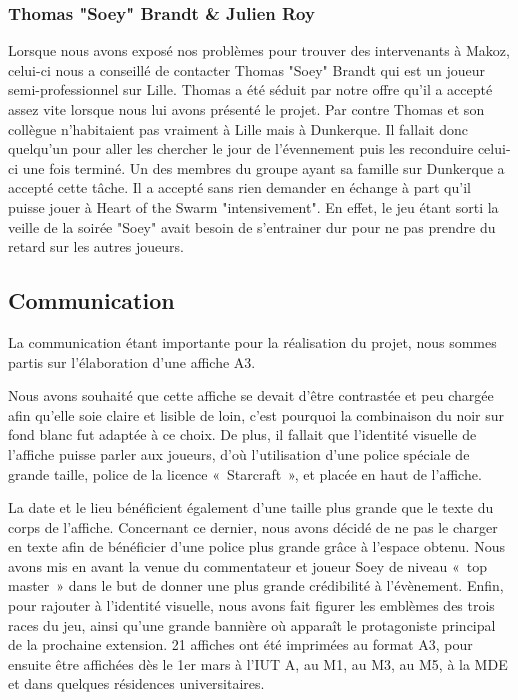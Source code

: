 \subsubsection{Thomas "Soey" Brandt \& Julien Roy}%
\label{ssub:tthomas_soey_brandt_&_julien_roy}

Lorsque nous avons exposé nos problèmes pour trouver des intervenants à
Makoz, celui-ci nous a conseillé de contacter Thomas "Soey" Brandt qui
est un joueur semi-professionnel sur Lille. Thomas a été séduit par
notre offre qu'il a accepté assez vite lorsque nous lui avons présenté
le projet. Par contre Thomas et son collègue n'habitaient pas vraiment à
Lille mais à Dunkerque. Il fallait donc quelqu'un pour aller les
chercher le jour de l'évennement puis les reconduire celui-ci une fois
terminé. Un des membres du groupe ayant sa famille sur Dunkerque a
accepté cette tâche. Il a accepté sans rien demander en échange à part
qu'il puisse jouer à Heart of the Swarm "intensivement". En effet, le
jeu étant sorti la veille de la soirée "Soey" avait besoin de
s'entrainer dur pour ne pas prendre du retard sur les autres joueurs.


\subsection{Communication}%
\label{sub:communication}

La communication étant importante pour la réalisation du projet, nous sommes partis sur l'élaboration
d'une affiche A3.

Nous avons souhaité que cette affiche se devait d’être contrastée et peu chargée afin qu’elle soie
claire et lisible de loin, c’est pourquoi la combinaison du noir sur fond blanc fut adaptée à ce choix.
De plus, il fallait que l’identité visuelle de l’affiche puisse parler aux joueurs, d’où l’utilisation
d’une police spéciale de grande taille, police de la licence « Starcraft », et placée en haut de l’affiche.

La date et le lieu bénéficient également d’une taille plus grande que le texte du corps de l’affiche.
Concernant ce dernier, nous avons décidé de ne pas le charger en texte afin de bénéficier d’une police
plus grande grâce à l’espace obtenu.
Nous avons mis en avant la venue du commentateur et joueur Soey  de niveau « top master »  dans le but
de donner une plus grande crédibilité à l’évènement.
Enfin, pour rajouter à l’identité visuelle, nous avons fait figurer  les emblèmes des trois races du jeu,
ainsi qu’une grande bannière où apparaît le protagoniste principal de la prochaine extension.
21 affiches ont été imprimées au format A3, pour ensuite être affichées dès le 1er mars à l’IUT A, au M1,
au M3, au M5, à la MDE et dans quelques résidences universitaires.

